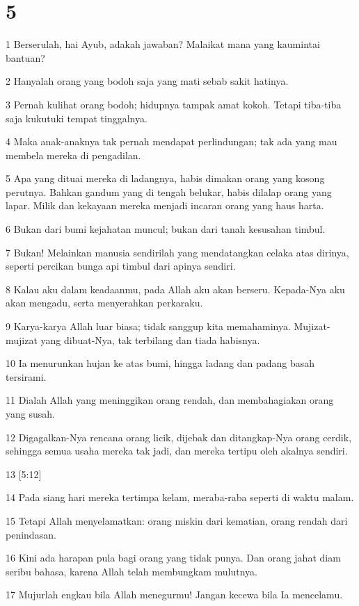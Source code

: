 \chapter{5}

\par 1 Berserulah, hai Ayub, adakah jawaban? Malaikat mana yang kaumintai bantuan?
\par 2 Hanyalah orang yang bodoh saja yang mati sebab sakit hatinya.
\par 3 Pernah kulihat orang bodoh; hidupnya tampak amat kokoh. Tetapi tiba-tiba saja kukutuki tempat tinggalnya.
\par 4 Maka anak-anaknya tak pernah mendapat perlindungan; tak ada yang mau membela mereka di pengadilan.
\par 5 Apa yang dituai mereka di ladangnya, habis dimakan orang yang kosong perutnya. Bahkan gandum yang di tengah belukar, habis dilalap orang yang lapar. Milik dan kekayaan mereka menjadi incaran orang yang haus harta.
\par 6 Bukan dari bumi kejahatan muncul; bukan dari tanah kesusahan timbul.
\par 7 Bukan! Melainkan manusia sendirilah yang mendatangkan celaka atas dirinya, seperti percikan bunga api timbul dari apinya sendiri.
\par 8 Kalau aku dalam keadaanmu, pada Allah aku akan berseru. Kepada-Nya aku akan mengadu, serta menyerahkan perkaraku.
\par 9 Karya-karya Allah luar biasa; tidak sanggup kita memahaminya. Mujizat-mujizat yang dibuat-Nya, tak terbilang dan tiada habisnya.
\par 10 Ia menurunkan hujan ke atas bumi, hingga ladang dan padang basah tersirami.
\par 11 Dialah Allah yang meninggikan orang rendah, dan membahagiakan orang yang susah.
\par 12 Digagalkan-Nya rencana orang licik, dijebak dan ditangkap-Nya orang cerdik, sehingga semua usaha mereka tak jadi, dan mereka tertipu oleh akalnya sendiri.
\par 13 [5:12]
\par 14 Pada siang hari mereka tertimpa kelam, meraba-raba seperti di waktu malam.
\par 15 Tetapi Allah menyelamatkan: orang miskin dari kematian, orang rendah dari penindasan.
\par 16 Kini ada harapan pula bagi orang yang tidak punya. Dan orang jahat diam seribu bahasa, karena Allah telah membungkam mulutnya.
\par 17 Mujurlah engkau bila Allah menegurmu! Jangan kecewa bila Ia mencelamu.
